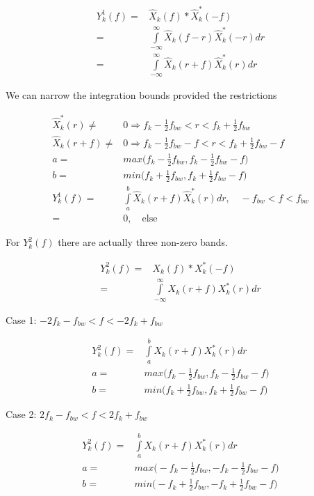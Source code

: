 \documentclass [11pt, proquest,oneside] {uwthesis}[2015/03/03]
\begin{document}
\begin{align}
Y_{k}^1(f) =& \widehat{X}_{k}(f) * \widehat{X}_{k}^*(-f) \\
=& \int\limits_{-\infty}^{\infty} \widehat{X}_{k}(f - r) \widehat{X}_{k}^*(-r)dr \\
=& \int\limits_{-\infty}^{\infty} \widehat{X}_{k}(r + f) \widehat{X}_{k}^*(r)dr
\end{align}

We can narrow the integration bounds provided the restrictions

\begin{align}
\widehat{X}_{k}^*(r) \neq& 0 \Rightarrow  f_k - \frac{1}{2} f_{bw} < r < f_k + \frac{1}{2} f_{bw} \\
\widehat{X}_{k}(r + f) \neq& 0 \Rightarrow  f_k - \frac{1}{2} f_{bw} - f < r < f_k + \frac{1}{2} f_{bw} - f \\
a =& max\Big( f_k - \frac{1}{2} f_{bw},  f_k - \frac{1}{2} f_{bw} - f\Big) \\
b =& min\Big( f_k + \frac{1}{2} f_{bw},  f_k + \frac{1}{2} f_{bw} - f\Big) \\
Y_{k}^1(f) =& \int\limits_{a}^{b} \widehat{X}_{k}(r + f) \widehat{X}_{k}^*(r)dr, \quad -f_{bw} < f < f_{bw} \\
=& 0, \quad \mathrm{else}
\end{align}

For $Y_k^2(f)$ there are actually three non-zero bands.

\begin{align}
Y_{k}^2(f) =& X_{k}(f) * X_{k}^*(-f) \\
=& \int\limits_{-\infty}^{\infty} X_{k}(r + f) X_{k}^*(r)dr
\end{align}

Case 1: $-2f_k - f_{bw} < f < -2f_k + f_{bw}$

\begin{align}
Y_{k}^2(f) =& \int\limits_{a}^{b} X_{k}(r + f) X_{k}^*(r)dr \\
a =& max\Big( f_k - \frac{1}{2} f_{bw},  f_k - \frac{1}{2} f_{bw} - f\Big) \\
b =& min\Big( f_k + \frac{1}{2} f_{bw},  f_k + \frac{1}{2} f_{bw} - f\Big)
\end{align}

Case 2: $2f_k - f_{bw} < f < 2f_k + f_{bw}$

\begin{align}
Y_{k}^2(f) =& \int\limits_{a}^{b} X_{k}(r + f) X_{k}^*(r)dr \\
a =& max\Big( -f_k - \frac{1}{2} f_{bw},  -f_k - \frac{1}{2} f_{bw} - f\Big) \\
b =& min\Big( -f_k + \frac{1}{2} f_{bw},  -f_k + \frac{1}{2} f_{bw} - f\Big)
\end{align}
\end{document}
